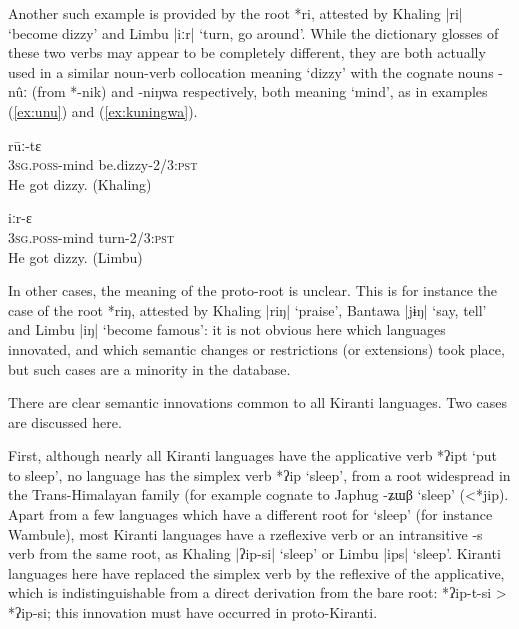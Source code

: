 \documentclass[oneside,a4paper,11pt]{article}
\newcommand{\ipa}[1]{{\phon\mbox{#1}}} %
\newcommand{\dhatu}[2]{|\ipa{#1}| `#2'}
\begin{document}
Another such example is provided by the root *\ipa{ri}, attested by Khaling \dhatu{ri}{become dizzy} and Limbu \dhatu{iːr}{turn, go around}. While the dictionary glosses of these two verbs may appear to be completely different, they are both actually used in a similar noun-verb collocation meaning `dizzy' with the cognate nouns \ipa{-nûː} (from \ipa{*-nik}) and \ipa{-niŋwa} respectively, both meaning `mind', as in examples (\ref{ex:unu}) and (\ref{ex:kuningwa}).

\begin{exe}
\ex \label{ex:unu}
\gll \ipa{ʔu-nûː} \ipa{rūː-tɛ} \\
\textsc{3sg.poss}-mind be.dizzy-\textsc{2/3:pst} \\
\glt He got dizzy. (Khaling)
\end{exe}


\begin{exe}
\ex \label{ex:kuningwa}
\gll \ipa{ku-niŋwa} \ipa{iːr-ɛ} \\
\textsc{3sg.poss}-mind turn-\textsc{2/3:pst} \\
\glt He got dizzy. (Limbu)
\end{exe}



In other cases, the meaning of the proto-root is unclear. This is for instance the case of the root \ipa{*riŋ}, attested by Khaling \dhatu{riŋ}{praise}, Bantawa \dhatu{jɨŋ}{say, tell} and Limbu \dhatu{iŋ}{become famous}: it is not obvious here which languages innovated, and which semantic changes or restrictions (or extensions) took place, but such cases are a minority in the database.

There are clear semantic innovations common to all Kiranti languages. Two cases are discussed here.

First, although nearly all Kiranti languages have the applicative verb *\ipa{ʔipt} `put to sleep', no language has the simplex verb *\ipa{ʔip} `sleep', from a root widespread in the Trans-Himalayan family (for example cognate to Japhug \ipa{-ʑɯβ} `sleep' (<*\ipa{jip}). Apart from a few languages which have a different root for `sleep' (for instance Wambule), most Kiranti languages have a rzeflexive verb or an intransitive \ipa{-s} verb from the same root, as Khaling \dhatu{ʔip-si}{sleep} or Limbu \dhatu{ips}{sleep}. Kiranti languages here have replaced the simplex verb by the reflexive of the applicative, which is indistinguishable from a direct derivation from the bare root: *\ipa{ʔip-t-si} > *\ipa{ʔip-si}; this innovation must have occurred in proto-Kiranti.
\end{document}
